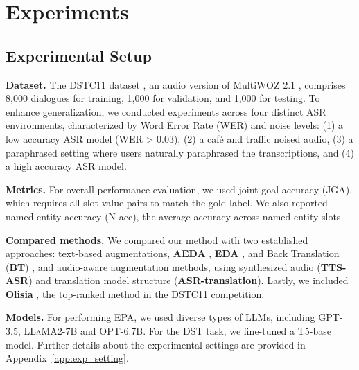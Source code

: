\vspace{-2pt}
\section{Experiments}
\vspace{-3pt}

\subsection{Experimental Setup}
\noindent
\textbf{Dataset.}  The DSTC11 dataset \cite{dstc11}, an audio version of MultiWOZ 2.1 \cite{woz2.1}, comprises 8,000 dialogues for training, 1,000 for validation, and 1,000 for testing. To enhance generalization, we conducted experiments across four distinct ASR environments, characterized by Word Error Rate (WER) and noise levels: (1) a low accuracy ASR model (WER > 0.03), (2) a café and traffic noised audio, (3) a paraphrased setting where users naturally paraphrased the transcriptions, and (4) a high accuracy ASR model.

\noindent
\textbf{Metrics.} For overall performance evaluation, we used joint goal accuracy (JGA), which requires all slot-value pairs to match the gold label. We also reported named entity accuracy (N-acc), the average accuracy across named entity slots.

\noindent
\textbf{Compared methods.}
We compared our method with two established approaches: text-based augmentations, \textbf{AEDA} \cite{aeda}, \textbf{EDA} \cite{eda}, and Back Translation (\textbf{BT}) \cite{BT}, and audio-aware augmentation methods, using synthesized audio (\textbf{TTS-ASR}) and translation model structure (\textbf{ASR-translation}). Lastly, we included \textbf{Olisia} \cite{jacqmin2023olisia}, the top-ranked method in the DSTC11 competition.


\noindent
\textbf{Models.} For performing EPA, we used diverse types of LLMs, including GPT-3.5\cite{openai}, \textsc{LLaMA2-7B}\cite{touvron2023llama} and OPT-6.7B\cite{zhang2022opt}.
For the DST task, we fine-tuned a T5-base\cite{t5} model. Further details about the experimental settings are provided in Appendix~\ref{app:exp_setting}.




